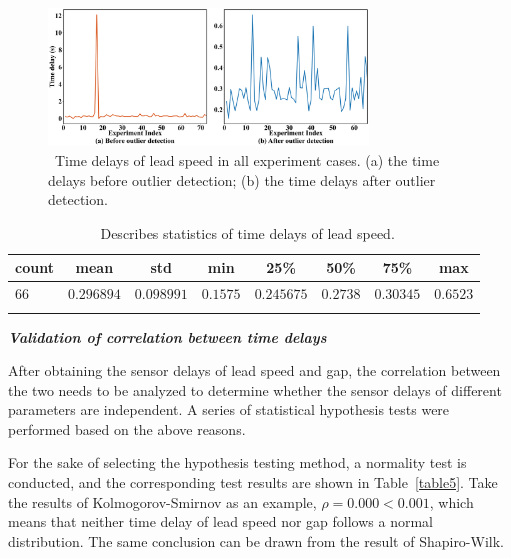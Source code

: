 \documentclass[journal]{IEEEtran}
\begin{document}
\begin{figure}
  \centering
  \includegraphics[width=8.5cm]{figs/fig5.png}
  \caption{~Time delays of lead speed in all experiment cases. (a) the time delays before outlier detection; (b) the time delays after outlier detection.}
  \label{fig5}
\end{figure}

\begin{table}
  \centering
  \setlength{\abovecaptionskip}{0pt}
  \setlength{\belowcaptionskip}{10pt}%
  \caption{~Describes statistics of time delays of lead speed.}
  {\begin{tabular}{lccccccc} \toprule
      count & mean       & std        & min      & 25\%       & 50\%     & 75\%      & max      \\ \midrule
      $66$  & $0.296894$ & $0.098991$ & $0.1575$ & $0.245675$ & $0.2738$ & $0.30345$ & $0.6523$ \\
      \bottomrule
      \label{table4}
    \end{tabular}}
\end{table}


\textbf{\emph{Validation of correlation between time delays}}

After obtaining the sensor delays of lead speed and gap, the correlation between the two needs to be analyzed to determine whether the sensor delays of different parameters are independent. A series of statistical hypothesis tests were performed based on the above reasons.

For the sake of selecting the hypothesis testing method, a normality test is conducted, and the corresponding test results are shown in Table~\ref{table5}. Take the results of Kolmogorov-Smirnov as an example, $\rho= 0.000<0.001$, which means that neither time delay of lead speed nor gap follows a normal distribution. The same conclusion can be drawn from the result of Shapiro-Wilk.
\end{document}
